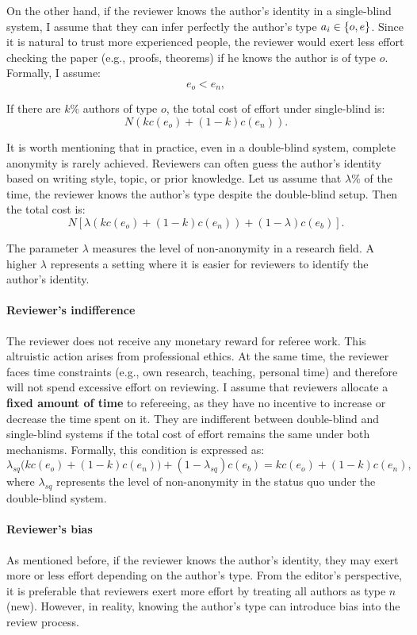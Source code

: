 \documentclass[12pt]{article}
\begin{document}
On the other hand, if the reviewer knows the author’s identity in a
single-blind system, I assume that they can infer perfectly the author’s type
$a_i \in \left\{o,e\right\}$. Since it is natural to trust more experienced people, the
reviewer would exert less effort checking the paper (e.g., proofs, theorems) if
he knows the author is of type $o$. Formally, I assume:
\[
    e_o < e_n,
\]

If there are $k\%$ authors of type $o$, the total cost of effort under
single-blind is:
\[
    N \left(k c(e_o) + (1-k) c(e_n)\right).
\]

It is worth mentioning that in practice, even in a double-blind system,
complete anonymity is rarely achieved. Reviewers can often guess the author’s
identity based on writing style, topic, or prior knowledge. Let us assume that
$\lambda\%$ of the time, the reviewer knows the author's type despite the
double-blind setup. Then the total cost is:
\[
    N \left[\lambda \left(k c(e_o) + (1-k) c(e_n)\right) + (1-\lambda) c(e_b)\right].
\]

The parameter $\lambda$ measures the level of non-anonymity in a research
field. A higher $\lambda$ represents a setting where it is easier for reviewers
to identify the author’s identity.

\paragraph{Reviewer's indifference}
The reviewer does not receive any monetary reward for referee work. This
altruistic action arises from professional ethics. At the same time, the
reviewer faces time constraints (e.g., own research, teaching, personal time)
and therefore will not spend excessive effort on reviewing. I assume that
reviewers allocate a \textbf{fixed amount of time} to refereeing, as they have
no incentive to increase or decrease the time spent on it. They are indifferent
between double-blind and single-blind systems if the total cost of effort
remains the same under both mechanisms. Formally, this condition is expressed
as:
\[
    \lambda_{sq} \big(k c(e_o) + (1-k) c(e_n)\big) + (1-\lambda_{sq}) c(e_b) = k c(e_o) + (1-k) c(e_n),
\]
where $\lambda_{sq}$ represents the level of non-anonymity in the status quo
under the double-blind system.

\paragraph{Reviewer's bias}
As mentioned before, if the reviewer knows the author's identity, they may
exert more or less effort depending on the author's type. From the editor's
perspective, it is preferable that reviewers exert more effort by treating all
authors as type $n$ (new). However, in reality, knowing the author's type can
introduce bias into the review process.
\end{document}
